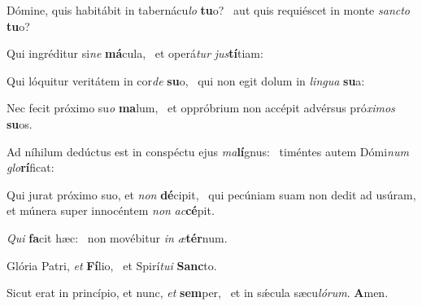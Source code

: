 \item Dómine, quis habitábit in tabernácu\textit{lo} \textbf{tu}o?~\psstar{} aut quis requiéscet in monte \textit{sancto} \textbf{tu}o?
\item Qui ingréditur si\textit{ne} \textbf{má}cula,~\psstar{} et operá\textit{tur} \textit{jus}\textbf{tí}tiam:
\item Qui lóquitur veritátem in cor\textit{de} \textbf{su}o,~\psstar{} qui non egit dolum in \textit{lingua} \textbf{su}a:
\item Nec fecit próximo su\textit{o} \textbf{ma}lum,~\psstar{} et oppróbrium non accépit advérsus pró\textit{ximos} \textbf{su}os.
\item Ad níhilum dedúctus est in conspéctu ejus \textit{ma}\textbf{lí}gnus:~\psstar{} timéntes autem Dómi\textit{num} \textit{glo}\textbf{rí}ficat:
\item Qui jurat próximo suo, et \textit{non} \textbf{dé}cipit,~\psstar{} qui pecúniam suam non dedit ad usúram, et múnera super innocéntem \textit{non} \textit{ac}\textbf{cé}pit.
\item \textit{Qui} \textbf{fa}cit hæc:~\psstar{} non movébitur \textit{in} \textit{æ}\textbf{tér}num.
\item Glória Patri, \textit{et} \textbf{Fí}lio,~\psstar{} et Spirí\textit{tui} \textbf{Sanc}to.
\item Sicut erat in princípio, et nunc, \textit{et} \textbf{sem}per,~\psstar{} et in sǽcula sæcu\textit{lórum}. \textbf{A}men.